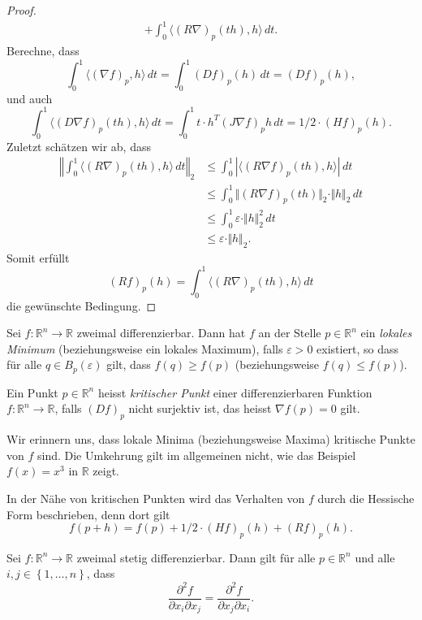 \documentclass[../main.tex]{subfiles}
\begin{document}
\begin{proof}
\begin{align*}
    + \int_{0}^{1} \langle {(R \nabla )}_p (th), h \rangle \, dt.
  \end{align*}
  Berechne, dass
  \[
    \int_{0}^{1} \langle {(\nabla f)}_p , h \rangle \, dt
    = \int_{0}^{1} {(Df)}_p(h) \, dt = {(Df)}_p (h),
  \]
  und auch
  \[
     \int_{0}^{1} \langle {(D \nabla f)}_p (th), h \rangle \, dt
     = \int_{0}^{1} t \cdot h^T {(J \nabla f)}_p h \, dt
     = 1/2 \cdot {(Hf)}_p(h).
  \]
  Zuletzt schätzen wir ab, dass
  \begin{align*}
    \left\Vert \int_{0}^{1} \langle {(R \nabla )}_p (th), h \rangle \, dt \right\Vert_2
    &\leq \int_{0}^{1} | \langle {(R \nabla f)}_p (th), h \rangle | \, dt  \\
    &\leq \int_{0}^{1} \Vert {(R \nabla f)}_p (th) \Vert_2
    \cdot \Vert h \Vert_2 \, dt \\
    &\leq \int_{0}^{1} \varepsilon \cdot \Vert h \Vert_2^2 \, dt \\
    &\leq \varepsilon \cdot \Vert h \Vert_2.
  \end{align*}
  Somit erfüllt
  \[
    {(Rf)}_p(h) = \int_{0}^{1} \langle {(R \nabla )}_p (th), h \rangle \, dt
  \]
  die gewünschte Bedingung.
\end{proof}

Sei $f \colon \mathbb{R}^n \to \mathbb{R}$ zweimal differenzierbar.
Dann hat $f$ an der Stelle $p \in \mathbb{R}^n$ 
ein \emph{lokales Minimum} (beziehungsweise ein lokales Maximum),
falls $\varepsilon > 0$ existiert, so dass für
alle $q \in B_p( \varepsilon)$ gilt, dass
$f(q) \geq f(p)$ (beziehungsweise $f(q) \leq f(p)$).

\begin{definition}
  Ein Punkt $p \in \mathbb{R}^n$ heisst \emph{kritischer Punkt}
  einer differenzierbaren Funktion $f \colon \mathbb{R}^n \to \mathbb{R}$, 
  falls
  ${(Df)}_p$ nicht surjektiv ist, das heisst
  $\nabla f(p) = 0$ gilt.
\end{definition}

\begin{remark}
  Wir erinnern uns, dass lokale Minima (beziehungsweise Maxima)
  kritische Punkte von $f$ sind. Die Umkehrung gilt im 
  allgemeinen nicht, wie das Beispiel
  $f(x) = x^3$ in $\mathbb{R}$ zeigt.
\end{remark}

In der Nähe von kritischen Punkten wird
das Verhalten von $f$ durch die Hessische
Form beschrieben, denn dort gilt
\[
  f(p + h) = f(p) + 1/2 \cdot {(Hf)}_p(h) + {(Rf)}_p(h).
\]

\begin{proposition}\label{prop:schwarz-theorem}
  Sei $f \colon \mathbb{R}^n \to \mathbb{R}$ zweimal stetig differenzierbar.
  Dann gilt für alle $p \in \mathbb{R}^n$ 
  und alle $i, j \in \left\{1, \dots, n \right\}$, dass
  \[
    \frac{\partial^2 f}{\partial x_i \partial x_j}
    =
    \frac{\partial^2 f}{\partial x_j \partial x_i}.
  \]
\end{proposition}
\end{document}
